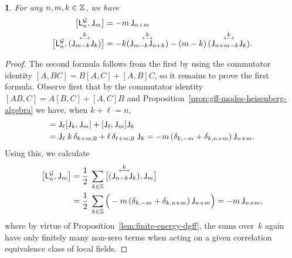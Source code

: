 \documentclass[12pt,oneside,english]{amsart}
\numberwithin{equation}{section}
\numberwithin{figure}{section}
\theoremstyle{plain}
\theoremstyle{plain}
\theoremstyle{plain}
\theoremstyle{plain}
\newtheorem{lem}[thm]{\protect\lemmaname}
\theoremstyle{remark}
\theoremstyle{definition}
\theoremstyle{plain}
\theoremstyle{plain}
\numberwithin{thm}{section}
\providecommand{\lemmaname}{Lemma}
\providecommand{\lemmaname}{Lemma}
\providecommand{\lemmaname}{Lemma}
\providecommand{\lemmaname}{Lemma}
\begin{document}
\begin{lem}
\label{lem:current-virasoro-commutation}
For any $n,m,k \in \mathbb{Z}$, we have
\begin{align*}
\big[\virL{n}^{\abbrDGFF}, \currmode{m} \big]
& = - m \, \currmode{n+m} \\
\big[ \virL{n}^{\abbrDGFF}, 
\ourorder{\currmode{m-k}}{\currmode{k}}{k} \big]
& = - k \ourorder{\currmode{m-k}}{\currmode{n+k}}{k}
    - \left(m-k\right) \ourorder{\currmode{n+m-k}}{\currmode{k}}{k} .
\end{align*}
\end{lem}
\begin{proof}
The second formula follows from the first by using the commutator identity
$[A,BC] = B[A,C] + [A,B]C$, so it remains to prove the first formula.
Observe first that by the commutator 
identity $[AB,C] = A[B,C] + [A,C]B$
and Proposition~\ref{prop:gff-modes-heisenberg-algebra} we have,
when $k + \ell = n$,
\begin{align*}
[\currmode{\ell} \currmode{k} , \currmode{m}]
= \; & \currmode{\ell} [ \currmode{k} , \currmode{m} ]
    + [\currmode{\ell} , \currmode{m} ] \currmode{k} \\
= \; & \currmode{\ell} \; k \, \delta_{k+m,0}
		+ \ell \, \delta_{\ell+m,0} \; \currmode{k}
= -m \, (\delta_{k,-m} + \delta_{k,n+m}) \, \currmode{n+m} .
\end{align*}
Using this, we calculate
\begin{align*}
\big[ \virL{n}^{\abbrDGFF}, \currmode{m} \big]
= \; & \frac{1}{2} \; \sum_{k \in \Z}
    \big[ \ourorder{\currmode{n-k}}{\currmode{k}}{k} , \currmode{m} \big] \\
= \; & \frac{1}{2} \; \sum_{k \in \Z}
    \Big( -m \, (\delta_{k,-m} + \delta_{k,n+m}) \, \currmode{n+m} \Big)
= -m \,  \currmode{n+m} ,
\end{align*}
where by virtue of Proposition~\ref{lem:finite-energy-dgff}, the sums over~$k$ 
again have only finitely many non-zero terms when acting on 
a given correlation equivalence class of local fields.
\end{proof}
\end{document}
